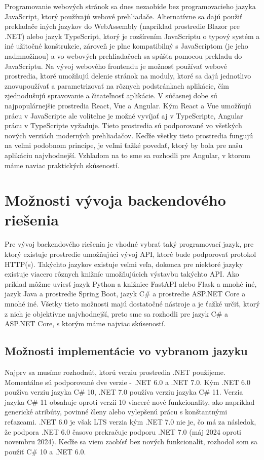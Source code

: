 Programovanie webových stránok sa dnes nezaobíde bez programovacieho jazyka JavaScript, ktorý používajú webové prehliadače. Alternatívne 
sa dajú použiť prekladače iných jazykov do WebAssembly (napríklad prostredie Blazor pre .NET) alebo jazyk TypeScript, ktorý je rozšírením JavaScriptu o typový 
systém a iné užitočné konštrukcie, zároveň je plne kompatibilný s JavaScriptom (je jeho nadmnožinou) a vo webových prehliadačoch sa spúšťa pomocou 
prekladu do JavaScriptu. Na vývoj webového frontendu je možnosť používať webové prostredia, ktoré umožňujú delenie stránok na moduly, 
ktoré sa dajú jednotlivo znovupoužívať a parametrizovať na rôznych podstránkach aplikácie, čím zjednodušujú spravovanie a čitateľnosť aplikácie. 
V súčasnej dobe sú najpopulárnejšie prostredia React, Vue a Angular. Kým React a Vue umožňujú prácu v JavaScripte ale volitelne je možné vyvíjať 
aj v TypeScripte, Angular prácu v TypeScripte vyžaduje. Tieto prostredia sú podporované vo všetkých nových verziách moderných prehliadačov. 
Keďže všetky tieto prostredia fungujú na veľmi podobnom princípe, je veľmi ťažké povedať, ktorý by bola pre našu aplikáciu najvhodnejší. Vzhľadom 
na to sme sa rozhodli pre Angular, v ktorom máme naviac praktických skúseností.

\section{Možnosti vývoja backendového riešenia}

Pre vývoj backendového riešenia je vhodné vybrať taký programovací jazyk, pre ktorý existuje prostredie umožňujúci vývoj API, ktoré bude podporovať 
protokol HTTP(s). Takýchto jazykov existuje veľmi veľa, dokonca pre niektoré jazyky existuje viacero rôznych knižníc umožňujúcich výstavbu 
takýchto API. Ako príklad môžme uviesť jazyk Python a knižnice FastAPI alebo Flask a mnohé iné, jazyk Java a prostredie Spring Boot, jazyk C\# a 
prostredie ASP.NET Core a mnohé iné. Všetky tieto možnosti majú dostatočné nástroje a je ťažké určiť, ktorý z nich je objektívne najvhodnejší, 
preto sme sa rozhodli pre jazyk C\# a ASP.NET Core, s ktorým máme najviac skúseností.

\subsection{Možnosti implementácie vo vybranom jazyku}

Najprv sa musíme rozhodnúť, ktorú verziu prostredia .NET použijeme. Momentálne sú podporované dve verzie - .NET 6.0 a .NET 7.0. Kým .NET 6.0 
používa verziu jazyka C\# 10, .NET 7.0 používa verziu jazyka C\# 11. Verzia jazyka C\# 11 obsahuje oproti verzii 10 viaceré nové funkcionality,
ako napríklad generické atribúty, povinné členy alebo vylepšenú prácu s konštantnými reťazcami. .NET 6.0 je však LTS verzia kým .NET 7.0 nie je, 
čo má za následok, že podpora .NET 6.0 časovo prekračuje podporu .NET 7.0 (máj 2024 oproti novembru 2024). Keďže sa viem zaobísť bez nových 
funkcionalít, rozhodol som sa použiť C\# 10 a .NET 6.0.

